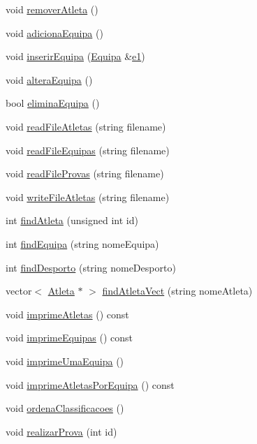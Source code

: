 \begin{DoxyCompactItemize}
\item 
void \hyperlink{class_campeonato_aa81be7f36c3daf7dc1f4d97f4274e953}{remover\+Atleta} ()
\item 
void \hyperlink{class_campeonato_a61f99e0dac86a67b21facebdc6a6d6a1}{adiciona\+Equipa} ()
\item 
void \hyperlink{class_campeonato_a5c09e9bc272f96875121ef9026c26434}{inserir\+Equipa} (\hyperlink{class_equipa}{Equipa} \&\hyperlink{main_8h_a94bd6f24df224a4dd936a7dba7521ff0}{e1})
\item 
void \hyperlink{class_campeonato_a79600008b0e5fc40b578da54519aee47}{altera\+Equipa} ()
\item 
bool \hyperlink{class_campeonato_a059f992f3a9932dbcf232541640b4b45}{elimina\+Equipa} ()
\item 
void \hyperlink{class_campeonato_a4f443b1fb65733062b40dd529d5ad63e}{read\+File\+Atletas} (string filename)
\item 
void \hyperlink{class_campeonato_a93f60ccc2608b0c99a978bc93fd881ac}{read\+File\+Equipas} (string filename)
\item 
void \hyperlink{class_campeonato_a4098bb3bde66ead9ecaa61e10aef2a5e}{read\+File\+Provas} (string filename)
\item 
void \hyperlink{class_campeonato_a8102c353a574b0ada7d35b537365a54e}{write\+File\+Atletas} (string filename)
\item 
int \hyperlink{class_campeonato_a662db361dc8464fa6ced60048e45ca1a}{find\+Atleta} (unsigned int id)
\item 
int \hyperlink{class_campeonato_a8002616a409e12a1ba2798d60c04f9dc}{find\+Equipa} (string nome\+Equipa)
\item 
int \hyperlink{class_campeonato_a64574dd8d105367c49d794a42e4a2aa8}{find\+Desporto} (string nome\+Desporto)
\item 
vector$<$ \hyperlink{class_atleta}{Atleta} $\ast$ $>$ \hyperlink{class_campeonato_abe0557f6d0fe33787a6d44e85fd8bda3}{find\+Atleta\+Vect} (string nome\+Atleta)
\item 
void \hyperlink{class_campeonato_a6a51ed1d4c6ca51bdc407144589d5894}{imprime\+Atletas} () const 
\item 
void \hyperlink{class_campeonato_a9e43dc72a8bf29c332209a37a8bdb1d8}{imprime\+Equipas} () const 
\item 
void \hyperlink{class_campeonato_a47a2b89c44b6705afa2478109d8b6b78}{imprime\+Uma\+Equipa} ()
\item 
void \hyperlink{class_campeonato_a4bbcc137067e9f72c169e22ce1c28858}{imprime\+Atletas\+Por\+Equipa} () const 
\item 
void \hyperlink{class_campeonato_ae1c0453864ac35ca78f076dd33c5c8a2}{ordena\+Classificacoes} ()
\item 
void \hyperlink{class_campeonato_ac00744815952c31c3d5ba905dbc1494c}{realizar\+Prova} (int id)
\end{DoxyCompactItemize}
